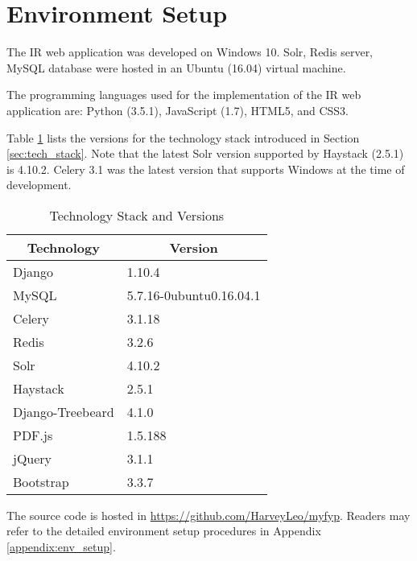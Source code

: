 \section{Environment Setup}
The IR web application was developed on Windows 10. Solr, Redis server, MySQL database were hosted in an Ubuntu (16.04) virtual machine.

The programming languages used for the implementation of the IR web application are: Python (3.5.1), JavaScript (1.7), HTML5, and CSS3.

Table \ref{tbl:tech_ver} lists the versions for the technology stack introduced in Section \ref{sec:tech_stack}. Note that the latest Solr version supported by Haystack (2.5.1) is 4.10.2. Celery 3.1 was the latest version that supports Windows at the time of development.

\begin{table}[!htbp]
\centering
\begingroup
\renewcommand{\arraystretch}{1.2}
\caption{Technology Stack and Versions}
\label{tbl:tech_ver}
\begin{tabular}{ll}
\toprule
\multicolumn{1}{c}{\textbf{Technology}}  & \multicolumn{1}{c}{\textbf{Version}} \\ \midrule
Django           & 1.10.4                  \\
MySQL            & 5.7.16-0ubuntu0.16.04.1 \\
Celery           & 3.1.18                  \\
Redis            & 3.2.6                   \\
Solr             & 4.10.2                  \\
Haystack         & 2.5.1                   \\
Django-Treebeard & 4.1.0                   \\
PDF.js           & 1.5.188                 \\
jQuery           & 3.1.1                   \\ 
Bootstrap        & 3.3.7                   \\ \bottomrule
\end{tabular}
\endgroup
\end{table}

The source code is hosted in \url{https://github.com/HarveyLeo/myfyp}. Readers may refer to the detailed environment setup procedures in Appendix \ref{appendix:env_setup}. 
